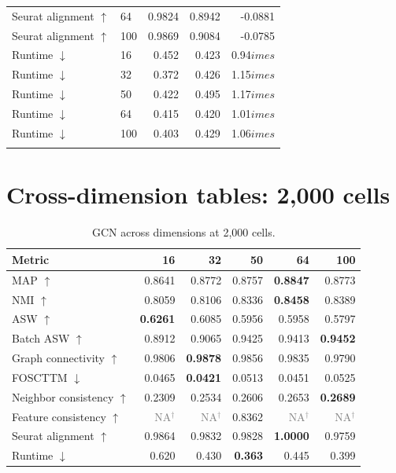\documentclass[10pt]{article}
\begin{document}
\begin{landscape}
\begin{longtable}{@{}llrrr@{}}
Seurat alignment $\uparrow$ & 64 & 0.9824 & 0.8942 & -0.0881 \\
Seurat alignment $\uparrow$ & 100 & 0.9869 & 0.9084 & -0.0785 \\
\addlinespace
Runtime $\downarrow$ & 16 & 0.452 & 0.423 & 0.94$	imes$ \\
Runtime $\downarrow$ & 32 & 0.372 & 0.426 & 1.15$	imes$ \\
Runtime $\downarrow$ & 50 & 0.422 & 0.495 & 1.17$	imes$ \\
Runtime $\downarrow$ & 64 & 0.415 & 0.420 & 1.01$	imes$ \\
Runtime $\downarrow$ & 100 & 0.403 & 0.429 & 1.06$	imes$ \\
\addlinespace
\bottomrule\end{longtable}\end{landscape}
\section{Cross-dimension tables: 2,000 cells}
\begin{table}[H]\centering\scriptsize
\caption{GCN across dimensions at 2,000 cells.}
\begin{tabular}{@{}lrrrrr@{}}\toprule
Metric & 16 & 32 & 50 & 64 & 100 \\\midrule
MAP $\uparrow$ & 0.8641 & 0.8772 & 0.8757 & \textbf{0.8847} & 0.8773 \\
NMI $\uparrow$ & 0.8059 & 0.8106 & 0.8336 & \textbf{0.8458} & 0.8389 \\
ASW $\uparrow$ & \textbf{0.6261} & 0.6085 & 0.5956 & 0.5958 & 0.5797 \\
Batch ASW $\uparrow$ & 0.8912 & 0.9065 & 0.9425 & 0.9413 & \textbf{0.9452} \\
Graph connectivity $\uparrow$ & 0.9806 & \textbf{0.9878} & 0.9856 & 0.9835 & 0.9790 \\
FOSCTTM $\downarrow$ & 0.0465 & \textbf{0.0421} & 0.0513 & 0.0451 & 0.0525 \\
Neighbor consistency $\uparrow$ & 0.2309 & 0.2534 & 0.2606 & 0.2653 & \textbf{0.2689} \\
Feature consistency $\uparrow$ & \textcolor{gray}{NA$^{\dagger}$} & \textcolor{gray}{NA$^{\dagger}$} & 0.8362 & \textcolor{gray}{NA$^{\dagger}$} & \textcolor{gray}{NA$^{\dagger}$} \\
Seurat alignment $\uparrow$ & 0.9864 & 0.9832 & 0.9828 & \textbf{1.0000} & 0.9759 \\
Runtime $\downarrow$ & 0.620 & 0.430 & \textbf{0.363} & 0.445 & 0.399 \\
\bottomrule\end{tabular}\end{table}
\end{document}
